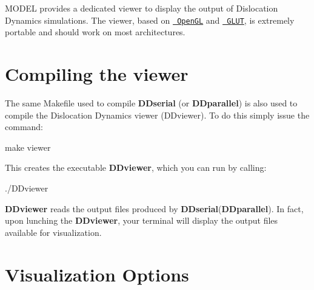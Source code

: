 M\+O\+D\+EL provides a dedicated viewer to display the output of Dislocation Dynamics simulations. The viewer, based on \href{http://www.opengl.org}{\texttt{ Open\+GL}} and \href{http://www.opengl.org/resources/libraries/glut/}{\texttt{ G\+L\+UT}}, is extremely portable and should work on most architectures.\hypertarget{_d_d_visualization_DD_viewer_compiling}{}\section{Compiling the viewer}\label{_d_d_visualization_DD_viewer_compiling}
The same Makefile used to compile {\bfseries{D\+Dserial}} (or {\bfseries{D\+Dparallel}}) is also used to compile the Dislocation Dynamics viewer (D\+Dviewer). To do this simply issue the command\+: \begin{DoxyVerb}make viewer
\end{DoxyVerb}
 This creates the executable {\bfseries{D\+Dviewer}}, which you can run by calling\+: \begin{DoxyVerb}./DDviewer
\end{DoxyVerb}


{\bfseries{D\+Dviewer}} reads the output files produced by {\bfseries{D\+Dserial}}({\bfseries{D\+Dparallel}}). In fact, upon lunching the {\bfseries{D\+Dviewer}}, your terminal will display the output files available for visualization.\hypertarget{_d_d_visualization_DD_visualization_options}{}\section{Visualization Options}\label{_d_d_visualization_DD_visualization_options}
      